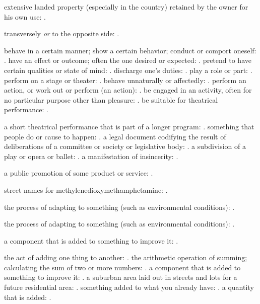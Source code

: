   extensive landed property (especially in the country) retained by the owner for his own use: .

  transversely \textit{or} to the opposite side: .

  behave in a certain manner; show a certain behavior; conduct or comport oneself: . have an effect or outcome; often the one desired or expected: . pretend to have certain qualities or state of mind: . discharge one's duties: . play a role or part: . perform on a stage or theater: . behave unnaturally or affectedly: . perform an action, or work out or perform (an action): . be engaged in an activity, often for no particular purpose other than pleasure: . be suitable for theatrical performance: .

  a short theatrical performance that is part of a longer program: . something that people do or cause to happen: . a legal document codifying the result of deliberations of a committee or society or legislative body: . a subdivision of a play or opera or ballet: . a manifestation of insincerity: .

  a public promotion of some product or service: .

  street names for methylenedioxymethamphetamine: .

  the process of adapting to something (such as environmental conditions): .

  the process of adapting to something (such as environmental conditions): .

  a component that is added to something to improve it: .

  the act of adding one thing to another: . the arithmetic operation of summing; calculating the sum of two or more numbers: . a component that is added to something to improve it: . a suburban area laid out in streets and lots for a future residential area: . something added to what you already have: . a quantity that is added: .

